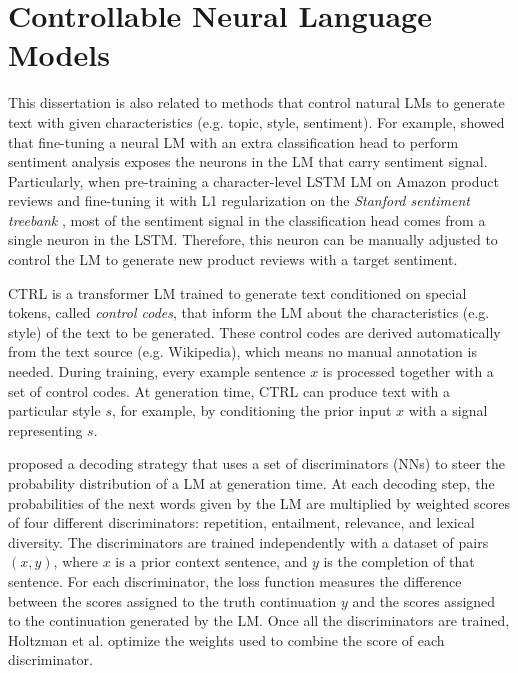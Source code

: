 
\section{Controllable Neural Language Models}
\label{sec:related_nlp}

This dissertation is also related to methods that control natural LMs to generate text with given characteristics (e.g. topic, style, sentiment). For example, \citet{radford_2017} showed that fine-tuning a neural LM with an extra classification head to perform sentiment analysis exposes the neurons in the LM that carry sentiment signal. Particularly, when pre-training a character-level LSTM LM on Amazon product reviews \cite{He2016} and fine-tuning it with L1 regularization on the \textit{Stanford sentiment treebank} \cite{socher2013recursive}, most of the sentiment signal in the classification head comes from a single neuron in the LSTM. Therefore, this neuron can be manually adjusted to control the LM to generate new product reviews with a target sentiment. 

CTRL \cite{keskar2019ctrl} is a transformer LM trained to generate text conditioned on special tokens, called \textit{control codes}, that inform the LM about the characteristics (e.g. style) of the text to be generated. These control codes are derived automatically from the text source (e.g. Wikipedia), which means no manual annotation is needed. During training, every example sentence $x$ is processed together with a set of control codes. At generation time, CTRL can produce text with a particular style $s$, for example, by conditioning the prior input $x$ with a signal representing $s$.


\citet{holtzman2018learning} proposed a decoding strategy that uses a set of discriminators (NNs) to steer the probability distribution of a LM at generation time. At each decoding step, the probabilities of the next words given by the LM are multiplied by weighted scores of four different discriminators: repetition, entailment, relevance, and lexical diversity. The discriminators are trained independently with a dataset of pairs $(x, y)$, where $x$ is a prior context sentence, and $y$ is the completion of that sentence. For each discriminator, the loss function measures the difference between the scores assigned to the truth continuation $y$ and the scores assigned to the continuation generated by the LM. Once all the discriminators are trained, Holtzman et al. \cite{holtzman2018learning} optimize the weights used to combine the score of each discriminator.

